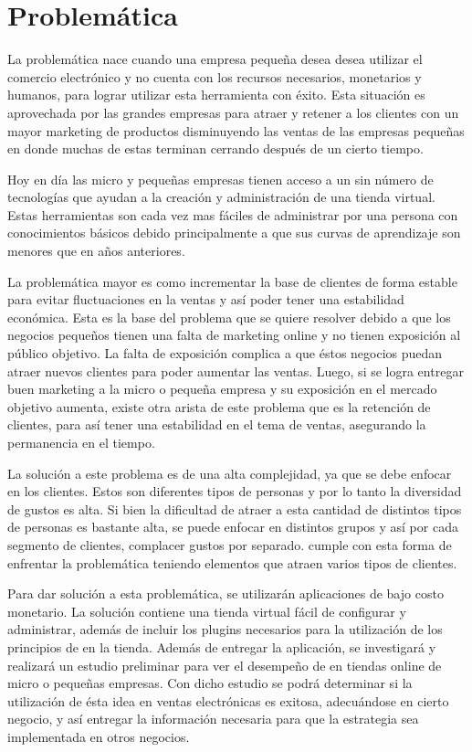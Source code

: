 \section{Problemática}

La problemática nace cuando una empresa pequeña desea desea utilizar el comercio
electrónico y no cuenta con los recursos necesarios, monetarios y humanos,
para lograr utilizar esta herramienta con éxito.
Esta situación es aprovechada por las grandes empresas para atraer y retener a los
clientes con un mayor marketing de productos disminuyendo las ventas de las
empresas pequeñas en donde muchas de estas terminan cerrando después de un cierto
tiempo.

Hoy en día las micro y pequeñas empresas tienen acceso a un sin número de
tecnologías que ayudan a la creación y administración de una tienda virtual.
Estas herramientas son cada vez mas fáciles de administrar por una persona
con conocimientos básicos debido principalmente a que sus curvas de aprendizaje
son menores que en años anteriores.

La problemática mayor es como incrementar la base de clientes de forma estable
para evitar fluctuaciones en la ventas y así poder tener una estabilidad económica.
Esta es la base del problema que se quiere resolver debido a que los negocios
pequeños tienen una falta de marketing online y no tienen exposición al público
objetivo.
La falta de exposición complica a que éstos negocios puedan atraer nuevos clientes
para poder aumentar las ventas.
Luego, si se logra entregar buen marketing a la micro o pequeña empresa y su
exposición en el mercado objetivo aumenta, existe otra arista de este problema
que es la retención de clientes, para así tener una estabilidad en el tema
de ventas, asegurando la permanencia en el tiempo.

La solución a este problema es de una alta complejidad, ya que se debe enfocar en
los clientes.
Estos son diferentes tipos de personas y por lo tanto la diversidad de gustos es
alta.
Si bien la dificultad de atraer a esta cantidad de distintos tipos de personas
es bastante alta, se puede enfocar en distintos grupos y así por cada segmento
de clientes, complacer gustos por separado.
{\GAM} cumple con esta forma de enfrentar la problemática teniendo elementos que
atraen varios tipos de clientes.

Para dar solución a esta problemática, se utilizarán aplicaciones de bajo costo
monetario.
La solución contiene una tienda virtual fácil de configurar y administrar,
además de incluir los plugins necesarios para la utilización de los principios
de {\GAM} en la tienda.
Además de entregar la aplicación, se investigará y realizará un estudio preliminar
para ver el desempeño de {\GAM} en tiendas online de micro o pequeñas empresas.
Con dicho estudio se podrá determinar si la utilización de ésta idea en ventas
electrónicas es exitosa, adecuándose en cierto negocio,
y así entregar la información necesaria para que la estrategia sea implementada
en otros negocios.
